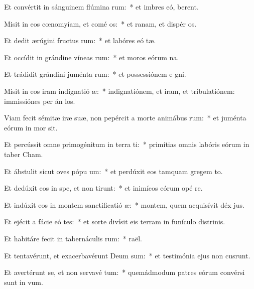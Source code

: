 \item Et convértit in sánguinem flúmina rum:~* et imbres eó,  berent.
\item Misit in eos cœnomyíam, et comé os:~* et ranam, et dispér os.
\item Et dedit ærúgini fructus rum:~* et labóres eó tæ.
\item Et occídit in grándine víneas rum:~* et moros eórum  na.
\item Et trádidit grándini juménta rum:~* et possessiónem e gni.
\item Misit in eos iram indignatió æ:~* indignatiónem, et iram, et tribulatiónem: immissiónes per án los.
\item Viam fecit sémitæ iræ suæ, non pepércit a morte animábus rum:~* et juménta eórum in mor sit.
\item Et percússit omne primogénitum in terra ti:~* primítias omnis labóris eórum in taber Cham.
\item Et ábstulit sicut oves pópu um:~* et perdúxit eos tamquam gregem  to.
\item Et dedúxit eos in spe, et non tirunt:~* et inimícos eórum opé re.
\item Et indúxit eos in montem sanctificatió æ:~* montem, quem acquisívit déx jus.
\item Et ejécit a fácie eó tes:~* et sorte divísit eis terram in funículo distrinis.
\item Et habitáre fecit in tabernáculis rum:~*  raël.
\item Et tentavérunt, et exacerbavérunt Deum sum:~* et testimónia ejus non cusrunt.
\item Et avertérunt se, et non servavé tum:~* quemádmodum patres eórum convérsi sunt in  vum.
